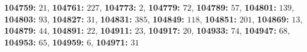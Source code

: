\textsf{\bfseries 104759:} $21$, \textsf{\bfseries 104761:} $227$, \textsf{\bfseries 104773:} $2$, \textsf{\bfseries 104779:} $72$, \textsf{\bfseries 104789:} $57$, \textsf{\bfseries 104801:} $139$, \textsf{\bfseries 104803:} $93$, \textsf{\bfseries 104827:} $31$, \textsf{\bfseries 104831:} $385$, \textsf{\bfseries 104849:} $118$, \textsf{\bfseries 104851:} $201$, \textsf{\bfseries 104869:} $13$, \textsf{\bfseries 104879:} $44$, \textsf{\bfseries 104891:} $22$, \textsf{\bfseries 104911:} $23$, \textsf{\bfseries 104917:} $20$, \textsf{\bfseries 104933:} $74$, \textsf{\bfseries 104947:} $68$, \textsf{\bfseries 104953:} $65$, \textsf{\bfseries 104959:} $6$, \textsf{\bfseries 104971:} $31$